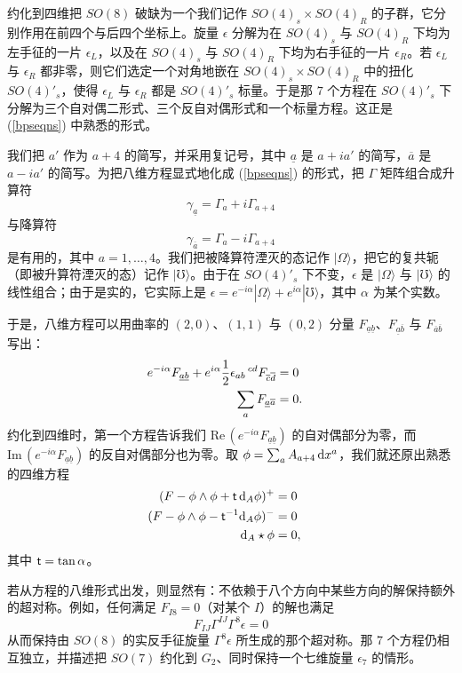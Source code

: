 约化到四维把 $SO(8)$ 破缺为一个我们记作 $SO(4)_s \times SO(4)_R$ 的子群，它分别作用在前四个与后四个坐标上。旋量 $\epsilon$ 分解为在 $SO(4)_s$ 与 $SO(4)_R$ 下均为左手征的一片 $\epsilon_L$，以及在 $SO(4)_s$ 与 $SO(4)_R$ 下均为右手征的一片 $\epsilon_R$。若 $\epsilon_L$ 与 $\epsilon_R$ 都非零，则它们选定一个对角地嵌在 $SO(4)_s \times SO(4)_R$ 中的扭化 $SO(4)'_s$，使得 $\epsilon_L$ 与 $\epsilon_R$ 都是 $SO(4)'_s$ 标量。于是那 $7$ 个方程在 $SO(4)'_s$ 下分解为三个自对偶二形式、三个反自对偶形式和一个标量方程。这正是 (\ref{bpseqns}) 中熟悉的形式。


\def\a{{\underline a}}
\def\aa{{\overline a}}
\def\b{{\underline b}}
\def\bb{{\overline b}}
我们把 $a'$ 作为 $a+4$ 的简写，并采用复记号，其中 $\a$ 是 $a+ia'$ 的简写，$\aa$ 是 $a-ia'$ 的简写。为把八维方程显式地化成 (\ref{bpseqns}) 的形式，把 $\Gamma$ 矩阵组合成升算符
\begin{equation}
\gamma_\a = \Gamma_a + i \Gamma_{a+4}
\end{equation}
与降算符
\begin{equation}
\gamma_{\aa} = \Gamma_a - i \Gamma_{a+4}
\end{equation}
是有用的，其中 $a=1,\dots,4$。我们把被降算符湮灭的态记作 $|\Omega\rangle$，把它的复共轭（即被升算符湮灭的态）记作 $|\mho\rangle$。由于在 $SO(4)'_s$ 下不变，$\epsilon$ 是 $|\Omega\rangle$ 与 $|\mho\rangle$ 的线性组合；由于是实的，它实际上是 $\epsilon =e^{-i \alpha} |\Omega \rangle+e^{i\alpha}|\mho\rangle$，其中 $\alpha$ 为某个实数。


于是，八维方程可以用曲率的 $(2,0)$、$(1,1)$ 与 $(0,2)$ 分量 $F_{\a\b}$、$F_{\a \bb}$ 与 $F_{\aa\bb}$ 写出：
\begin{align}
e^{-i \alpha}  F_{\a\b} + e^{i \alpha} \frac{1}{2} \epsilon_{ab}\,^{cd} 
F_{\overline c \overline d} &=0 \cr \sum_a F_{\a \aa}&=0.
\end{align} 
约化到四维时，第一个方程告诉我们 $ {\mathrm {Re}} \, (e^{-i \alpha} F_{\a \b}) $ 的自对偶部分为零，而 $ {\mathrm {Im}} \,( e^{-i \alpha} F_{\a\b}) $ 的反自对偶部分也为零。取 $\phi=\sum_a A_{a+4}\,{\mathrm d} x^a$，我们就还原出熟悉的四维方程
\begin{align} \label{dolk}(F-\phi\wedge \phi + { \sf t} \,{\mathrm d}_A\phi)^+&=0   \cr
                             (F-\phi\wedge\phi-{ \sf t}^{-1}{\mathrm d}_A\phi  )^- &=0 \cr
                               {\mathrm d}_A\star\phi&=0,                     \end{align}                                                                    
其中 ${ \sf t} = \tan \alpha$。

若从方程的八维形式出发，则显然有：不依赖于八个方向中某些方向的解保持额外的超对称。例如，任何满足 $F_{I8}=0$（对某个 $I$）的解也满足
\begin{equation}
F_{IJ} \Gamma^{IJ} \Gamma^8 \epsilon =0
\end{equation}
从而保持由 $SO(8)$ 的实反手征旋量 $\Gamma^8 \epsilon$ 所生成的那个超对称。那 7 个方程仍相互独立，并描述把 $SO(7)$ 约化到 $G_2$、同时保持一个七维旋量 $\epsilon_7$ 的情形。

